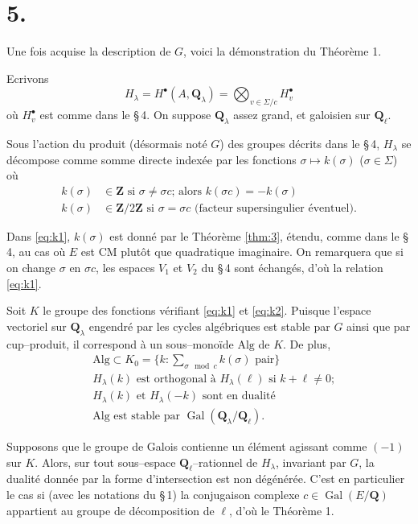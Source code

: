 \documentclass[11pt,a4paper]{article}
\theoremstyle{plain}
\theoremstyle{definition}
\DeclareMathOperator{\Gal}{Gal}
\begin{document}
\section*{5.}

Une fois acquise la description de $G$, voici la d\'emonstration du Th\'eor\`eme 1.

Ecrivons
\[
H_\lambda = H^\bullet(A, \mathbf{Q}_\lambda) = \bigotimes_{v \in \Sigma/c} H_v^\bullet
\]
o\`u $H_v^\bullet$ est comme dans le \S\,4. On suppose $\mathbf{Q}_\lambda$ assez grand, et galoisien sur $\mathbf{Q}_\ell$.

Sous l'action du produit (d\'esormais not\'e $G$) des groupes d\'ecrits dans le \S\,4, $H_\lambda$ se d\'ecompose comme somme directe index\'ee par les fonctions $\sigma \mapsto k(\sigma)$ ($\sigma \in \Sigma$) o\`u
\begin{align}
k(\sigma) &\in \mathbf{Z} \text{ si } \sigma \neq \sigma c \text{; alors } k(\sigma c) = -k(\sigma) \label{eq:k1}\\
k(\sigma) &\in \mathbf{Z}/2\mathbf{Z} \text{ si } \sigma = \sigma c \text{ (facteur supersingulier \'eventuel)} . \label{eq:k2}
\end{align}

Dans \eqref{eq:k1}, $k(\sigma)$ est donn\'e par le Th\'eor\`eme \ref{thm:3}, \'etendu, comme dans le \S\,4, au cas o\`u $E$ est CM plut\^ot que quadratique imaginaire. On remarquera que si on change $\sigma$ en $\sigma c$, les espaces $V_1$ et $V_2$ du \S\,4 sont \'echang\'es, d'o\`u la relation \eqref{eq:k1}.

Soit $K$ le groupe des fonctions v\'erifiant \eqref{eq:k1} et \eqref{eq:k2}. Puisque l'espace vectoriel sur $\mathbf{Q}_\lambda$ engendr\'e par les cycles alg\'ebriques est stable par $G$ ainsi que par cup--produit, il correspond \`a un sous--mono\"ide $\mathrm{Alg}$ de $K$. De plus,
\begin{align}
&\mathrm{Alg} \subset K_0 = \{k : \sum_{\sigma \mod c} k(\sigma) \text{ pair}\} \label{eq:alg1}\\
&H_\lambda(k) \text{ est orthogonal \`a } H_\lambda(\ell) \text{ si } k + \ell \neq 0 \text{;} \label{eq:alg2}\\
&H_\lambda(k) \text{ et } H_\lambda(-k) \text{ sont en dualit\'e} \label{eq:alg3}\\
&\mathrm{Alg} \text{ est stable par } \Gal(\mathbf{Q}_\lambda/\mathbf{Q}_\ell) . \label{eq:alg4}
\end{align}

Supposons que le groupe de Galois contienne un \'el\'ement agissant comme $(-1)$ sur $K$. Alors, sur tout sous--espace $\mathbf{Q}_\ell$--rationnel de $H_\lambda$, invariant par $G$, la dualit\'e donn\'ee par la forme d'intersection est non d\'eg\'en\'er\'ee. C'est en particulier le cas si (avec les notations du \S\,1) la conjugaison complexe $c \in \Gal(E/\mathbf{Q})$ appartient au groupe de d\'ecomposition de $\ell$, d'o\`u le Th\'eor\`eme 1.
\end{document}
